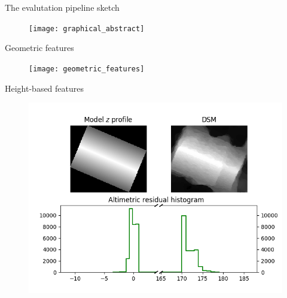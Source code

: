 \documentclass[export]{beamer}
\begin{document}
        \begin{frame}{The evalutation pipeline sketch}
            \begin{figure}
                \texttt{[image: graphical\_abstract]}
            \end{figure}
        \end{frame}
        \begin{frame}{Geometric features}
            \begin{figure}
                \texttt{[image: geometric\_features]}
            \end{figure}
        \end{frame}
        \begin{frame}{Height-based features}
            \begin{figure}
                \includegraphics[height=.7\textheight]{images/altimetric_features}
            \end{figure}
        \end{frame}
\end{document}
